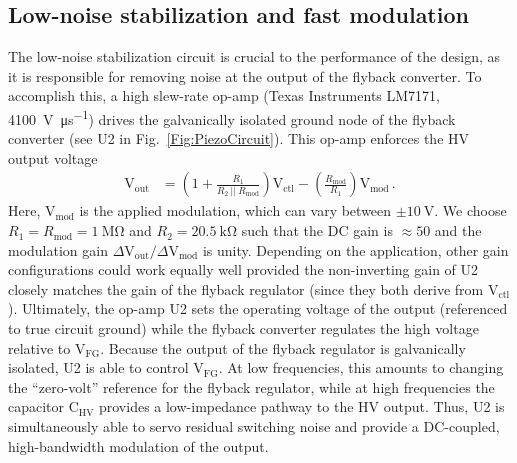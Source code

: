 \documentclass[aip,rsi,reprint]{revtex4-1} %
\begin{document}
\subsection{Low-noise stabilization and fast modulation}
\label{Sec:LowNoiseStabilization}

The low-noise stabilization circuit is crucial to the performance of the design, as it is responsible for removing noise at the output of the flyback converter.
To accomplish this, a high slew-rate op-amp (Texas Instruments LM7171, \SI[per-mode=symbol]{4100}{\volt\per\micro\second}) drives the galvanically isolated ground node of the flyback converter (see U2 in Fig.~\ref{Fig:PiezoCircuit}).
This op-amp enforces the HV output voltage
\begin{align}
\text{V}_\text{out} &= \left(1 + \frac{R_1}{R_2~||~R_\text{mod}}\right) \text{V}_\text{ctl} -
\left(\frac{R_\text{mod}}{R_1}\right) \text{V}_\text{mod}\,.
\label{Eq:FullTransferFunc}
\end{align}
Here, $\text{V}_\text{mod}$ is the applied modulation, which can vary between $\pm\SI{10}{\volt}$.
We choose $R_1 = R_\text{mod} = \SI{1}{\mega\ohm}$ and $R_2 = \SI{20.5}{\kilo\ohm}$ such that the DC gain is $\approx 50$ and the modulation gain $\Delta\text{V}_\text{out}/\Delta\text{V}_\text{mod}$ is unity.
Depending on the application, other gain configurations could work equally well provided the non-inverting gain of U2 closely matches the gain of the flyback regulator (since they both derive from $\text{V}_\text{ctl}$).
Ultimately, the op-amp U2 sets the operating voltage of the output (referenced to true circuit ground) while the flyback converter regulates the high voltage relative to $\text{V}_\text{FG}$.
Because the output of the flyback regulator is galvanically isolated, U2 is able to control $\text{V}_\text{FG}$. 
At low frequencies, this amounts to changing the ``zero-volt'' reference for the flyback regulator, while at high frequencies the capacitor $\text{C}_\text{HV}$ provides a low-impedance pathway to the HV output.
Thus, U2 is simultaneously able to servo residual switching noise and provide a DC-coupled, high-bandwidth modulation of the output.
\end{document}
